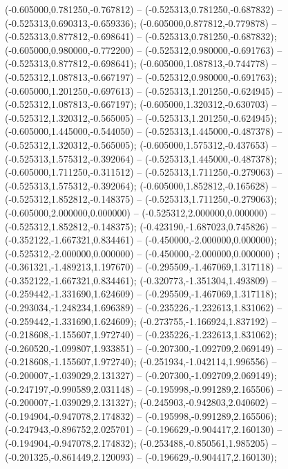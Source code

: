  (-0.605000,0.781250,-0.767812) -- (-0.525313,0.781250,-0.687832) -- (-0.525313,0.690313,-0.659336);
 (-0.605000,0.877812,-0.779878) -- (-0.525313,0.877812,-0.698641) -- (-0.525313,0.781250,-0.687832);
 (-0.605000,0.980000,-0.772200) -- (-0.525312,0.980000,-0.691763) -- (-0.525313,0.877812,-0.698641);
 (-0.605000,1.087813,-0.744778) -- (-0.525312,1.087813,-0.667197) -- (-0.525312,0.980000,-0.691763);
 (-0.605000,1.201250,-0.697613) -- (-0.525313,1.201250,-0.624945) -- (-0.525312,1.087813,-0.667197);
 (-0.605000,1.320312,-0.630703) -- (-0.525312,1.320312,-0.565005) -- (-0.525313,1.201250,-0.624945);
 (-0.605000,1.445000,-0.544050) -- (-0.525313,1.445000,-0.487378) -- (-0.525312,1.320312,-0.565005);
 (-0.605000,1.575312,-0.437653) -- (-0.525313,1.575312,-0.392064) -- (-0.525313,1.445000,-0.487378);
 (-0.605000,1.711250,-0.311512) -- (-0.525313,1.711250,-0.279063) -- (-0.525313,1.575312,-0.392064);
 (-0.605000,1.852812,-0.165628) -- (-0.525312,1.852812,-0.148375) -- (-0.525313,1.711250,-0.279063);
 (-0.605000,2.000000,0.000000) -- (-0.525312,2.000000,0.000000) -- (-0.525312,1.852812,-0.148375);
 (-0.423190,-1.687023,0.745826) -- (-0.352122,-1.667321,0.834461) -- (-0.450000,-2.000000,0.000000);
 (-0.525312,-2.000000,0.000000) -- (-0.450000,-2.000000,0.000000) ;
 (-0.361321,-1.489213,1.197670) -- (-0.295509,-1.467069,1.317118) -- (-0.352122,-1.667321,0.834461);
 (-0.320773,-1.351304,1.493809) -- (-0.259442,-1.331690,1.624609) -- (-0.295509,-1.467069,1.317118);
 (-0.293034,-1.248234,1.696389) -- (-0.235226,-1.232613,1.831062) -- (-0.259442,-1.331690,1.624609);
 (-0.273755,-1.166924,1.837192) -- (-0.218608,-1.155607,1.972740) -- (-0.235226,-1.232613,1.831062);
 (-0.260520,-1.099807,1.933851) -- (-0.207300,-1.092709,2.069149) -- (-0.218608,-1.155607,1.972740);
 (-0.251934,-1.042114,1.996556) -- (-0.200007,-1.039029,2.131327) -- (-0.207300,-1.092709,2.069149);
 (-0.247197,-0.990589,2.031148) -- (-0.195998,-0.991289,2.165506) -- (-0.200007,-1.039029,2.131327);
 (-0.245903,-0.942803,2.040602) -- (-0.194904,-0.947078,2.174832) -- (-0.195998,-0.991289,2.165506);
 (-0.247943,-0.896752,2.025701) -- (-0.196629,-0.904417,2.160130) -- (-0.194904,-0.947078,2.174832);
 (-0.253488,-0.850561,1.985205) -- (-0.201325,-0.861449,2.120093) -- (-0.196629,-0.904417,2.160130);
